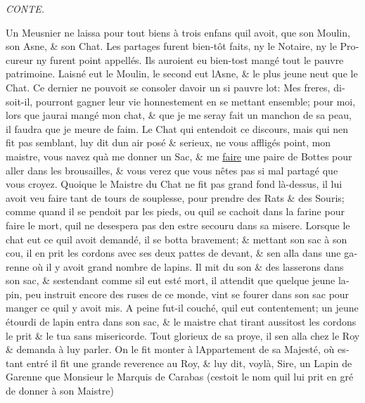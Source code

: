 \documentclass[14pt,a4paper]{memoir}
\newcommand{\ul}[1]{\uline{#1}}
\begin{document}
\begin{otherlanguage}{french}
\emph{CONTE.}

Un Meusnier ne laissa pour tout biens à trois enfans
qu\textquotesingle il avoit, que son Moulin, son Asne, \& son Chat. Les
partages furent bien-tôt faits, ny le Notaire, ny le Procureur
n\textquotesingle y furent point appellés. Ils auroient eu bien-tost
mangé tout le pauvre patrimoine. L\textquotesingle aisné eut le Moulin,
le second eut l\textquotesingle Asne, \& le plus jeune
n\textquotesingle eut que le Chat. Ce dernier ne pouvoit se consoler
d\textquotesingle avoir un si pauvre lot: Mes freres, disoit-il,
pourront gagner leur vie honnestement en se mettant ensemble; pour moi,
lors que j\textquotesingle aurai mangé mon chat, \& que je me seray fait
un manchon de sa peau, il faudra que je meure de faim. Le Chat qui
entendoit ce discours, mais qui n\textquotesingle en fit pas semblant,
luy dit dun air posé \& serieux, ne vous affligés point, mon maistre,
vous n\textquotesingle avez qu\textquotesingle à me donner un Sac, \& me
\ul{faire} une paire de Bottes pour aller dans les brousailles, \& vous
verez que vous n\textquotesingle êtes pas si mal partagé que vous
croyez. Quoique le Maistre du Chat ne fit pas grand fond là-dessus, il
lui avoit veu faire tant de tours de souplesse, pour prendre des Rats \&
des Souris; comme quand il se pendoit par les pieds, ou
qu\textquotesingle il se cachoit dans la farine pour faire le mort,
qu\textquotesingle il ne desespera pas d\textquotesingle en estre
secouru dans sa misere. Lorsque le chat eut ce qu\textquotesingle il
avoit demandé, il se botta bravement; \& mettant son sac à son cou, il
en prit les cordons avec ses deux pattes de devant, \&
s\textquotesingle en alla dans une garenne où il y avoit grand nombre de
lapins. Il mit du son \& des lasserons dans son sac, \&
s\textquotesingle estendant comme s\textquotesingle il eut esté mort, il
attendit que quelque jeune lapin, peu instruit encore des ruses de ce
monde, vint se fourer dans son sac pour manger ce qu\textquotesingle il
y avoit mis. A peine fut-il couché, qu\textquotesingle il eut
contentement; un jeune étourdi de lapin entra dans son sac, \& le
maistre chat tirant aussitost les cordons le prit \& le tua sans
misericorde. Tout glorieux de sa proye, il s\textquotesingle en alla
chez le Roy \& demanda à luy parler. On le fit monter à
l\textquotesingle Appartement de sa Majesté, où estant entré il fit une
grande reverence au Roy, \& luy dit, voylà, Sire, un Lapin de Garenne
que Monsieur le Marquis de Carabas (c\textquotesingle estoit le nom
qu\textquotesingle il lui prit en gré de donner à son Maistre)

\end{otherlanguage}
\end{document}
